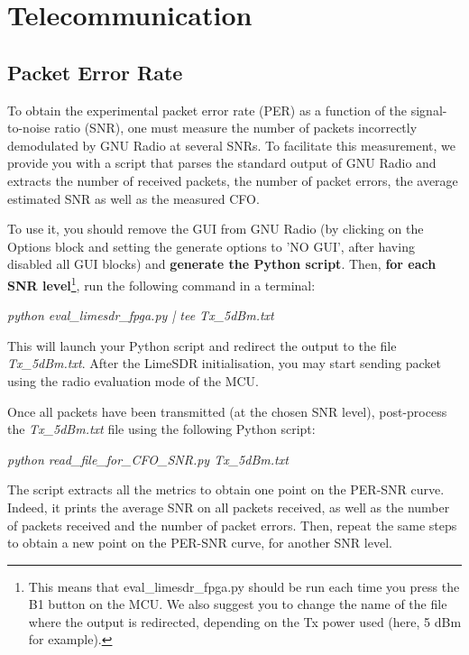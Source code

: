 \section{Telecommunication}
\subsection{Packet Error Rate}
To obtain the experimental packet error rate (PER) as a function of the signal-to-noise ratio (SNR), one must measure the number of packets incorrectly demodulated by GNU Radio at several SNRs. To facilitate this measurement, we provide you with a script that parses the standard output of GNU Radio and extracts the number of received packets, the number of packet errors, the average estimated SNR as well as the measured CFO.

To use it, you should remove the GUI from GNU Radio (by clicking on the Options block and setting the generate options to 'NO GUI', after having disabled all GUI blocks) and \textbf{generate the Python script}. Then, \textbf{for each SNR level}\footnote{This means that eval\_limesdr\_fpga.py should be run each time you press the B1 button on the MCU. We also suggest you to change the name of the file where the output is redirected, depending on the Tx power used (here, 5 dBm for example).}, run the following command in a terminal:
    \begin{center}
    \textit{python eval\_limesdr\_fpga.py | tee Tx\_5dBm.txt}\\
    \end{center}
This will launch your Python script and redirect the output to the file \textit{Tx\_5dBm.txt}. After the LimeSDR initialisation, you may start sending packet using the radio evaluation mode of the MCU.

Once all packets have been transmitted (at the chosen SNR level), post-process the \textit{Tx\_5dBm.txt} file using the following Python script:
    \begin{center}
    \textit{python read\_file\_for\_CFO\_SNR.py Tx\_5dBm.txt}\\
    \end{center}
The script extracts all the metrics to obtain one point on the PER-SNR curve. Indeed, it prints the average SNR on all packets received, as well as the number of packets received and the number of packet errors. Then, repeat the same steps to obtain a new point on the PER-SNR curve, for another SNR level.


